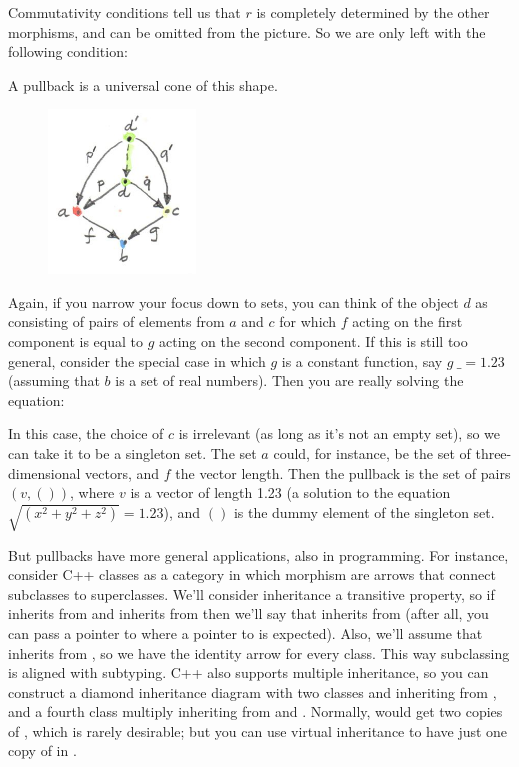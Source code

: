 \noindent
Commutativity conditions tell us that $r$ is completely
determined by the other morphisms, and can be omitted from the picture.
So we are only left with the following condition:

A pullback is a universal cone of this shape.

\begin{figure}[H]
  \centering
  \includegraphics[width=0.35\textwidth]{images/pullbacklimit.jpg}
\end{figure}

\noindent
Again, if you narrow your focus down to sets, you can think of the
object $d$ as consisting of pairs of elements from $a$ and
$c$ for which $f$ acting on the first component is equal
to $g$ acting on the second component. If this is still too
general, consider the special case in which $g$ is a constant
function, say $g~\_ = 1.23$ (assuming that $b$ is a set
of real numbers). Then you are really solving the equation:


In this case, the choice of $c$ is irrelevant (as long as it's
not an empty set), so we can take it to be a singleton set. The set
$a$ could, for instance, be the set of three-dimensional vectors,
and $f$ the vector length. Then the pullback is the set of pairs
$(v, ())$, where $v$ is a vector of length 1.23 (a
solution to the equation $\sqrt{(x^{2}+y^{2}+z^{2})} = 1.23$), and
$()$ is the dummy element of the singleton set.

But pullbacks have more general applications, also in programming. For
instance, consider C++ classes as a category in which morphism are
arrows that connect subclasses to superclasses. We'll consider
inheritance a transitive property, so if  inherits from  and 
inherits from  then we'll say that  inherits from  (after all, you
can pass a pointer to  where a pointer to  is expected). Also, we'll
assume that  inherits from , so we have the identity arrow for every
class. This way subclassing is aligned with subtyping. C++ also supports
multiple inheritance, so you can construct a diamond inheritance diagram
with two classes  and  inheriting from , and a fourth class 
multiply inheriting from  and . Normally,  would get two copies of ,
which is rarely desirable; but you can use virtual inheritance to have
just one copy of  in .

